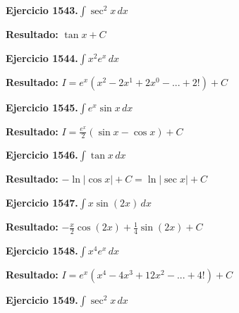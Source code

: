 \documentclass[10pt,a4paper]{article}
\begin{document}
\newpage
\begin{ejbox}
\textbf{Ejercicio 1543.}\quad $\int \sec^2 x\,dx$
\end{ejbox}

\begin{solbox}
\textbf{Resultado:} \(\displaystyle \tan x + C\)
\end{solbox}

\begin{ejbox}
\textbf{Ejercicio 1544.}\quad $\int x^{2} e^x\,dx$
\end{ejbox}

\begin{solbox}
\textbf{Resultado:} \(\displaystyle I = e^x(x^{2} - 2x^{1} + 2x^{0} - ... + 2!) + C\)
\end{solbox}

\begin{ejbox}
\textbf{Ejercicio 1545.}\quad $\int e^x\sin x\,dx$
\end{ejbox}

\begin{solbox}
\textbf{Resultado:} \(\displaystyle I = \frac{e^x}{2}(\sin x - \cos x) + C\)
\end{solbox}

\newpage
\begin{ejbox}
\textbf{Ejercicio 1546.}\quad $\int \tan x\,dx$
\end{ejbox}

\begin{solbox}
\textbf{Resultado:} \(\displaystyle -\ln|\cos x| + C = \ln|\sec x| + C\)
\end{solbox}

\begin{ejbox}
\textbf{Ejercicio 1547.}\quad $\int x \sin(2x)\,dx$
\end{ejbox}

\begin{solbox}
\textbf{Resultado:} \(\displaystyle -\frac{x}{2}\cos(2x) + \frac{1}{4}\sin(2x) + C\)
\end{solbox}

\begin{ejbox}
\textbf{Ejercicio 1548.}\quad $\int x^{4} e^x\,dx$
\end{ejbox}

\begin{solbox}
\textbf{Resultado:} \(\displaystyle I = e^x(x^{4} - 4x^{3} + 12x^{2} - ... + 4!) + C\)
\end{solbox}

\newpage
\begin{ejbox}
\textbf{Ejercicio 1549.}\quad $\int \sec^2 x\,dx$
\end{ejbox}
\end{document}
